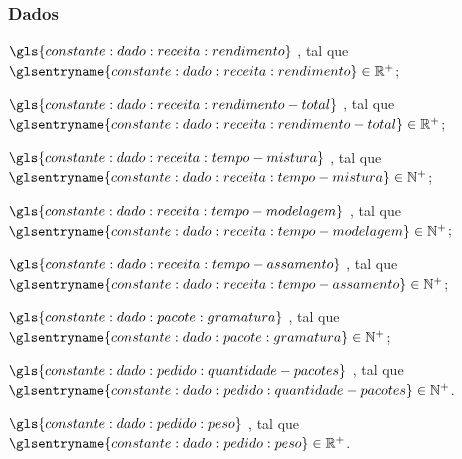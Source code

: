 \subsubsection{Dados}

\begin{symbols}
    \item[\( \gls{constante:dado:receita:rendimento} \)]
    ,
    tal que \( \glsentryname{constante:dado:receita:rendimento} \in \mathbb{R}^{+} \);

    \item[\( \gls{constante:dado:receita:rendimento-total} \)]
    ,
    tal que \( \glsentryname{constante:dado:receita:rendimento-total} \in \mathbb{R}^{+} \);

    \item[\( \gls{constante:dado:receita:tempo-mistura} \)]
    ,
    tal que \( \glsentryname{constante:dado:receita:tempo-mistura} \in \mathbb{N}^{+} \);

    \item[\( \gls{constante:dado:receita:tempo-modelagem} \)]
    ,
    tal que \( \glsentryname{constante:dado:receita:tempo-modelagem} \in \mathbb{N}^{+} \);

    \item[\( \gls{constante:dado:receita:tempo-assamento} \)]
    ,
    tal que \( \glsentryname{constante:dado:receita:tempo-assamento} \in \mathbb{N}^{+} \);

    \item[\( \gls{constante:dado:pacote:gramatura} \)]
    ,
    tal que \( \glsentryname{constante:dado:pacote:gramatura} \in \mathbb{N}^{+} \);

    \item[\( \gls{constante:dado:pedido:quantidade-pacotes} \)]
    ,
    tal que \( \glsentryname{constante:dado:pedido:quantidade-pacotes} \in \mathbb{N}^{+} \).

    \item[\( \gls{constante:dado:pedido:peso} \)]
    ,
    tal que \( \glsentryname{constante:dado:pedido:peso} \in \mathbb{R}^{+} \).
\end{symbols}

